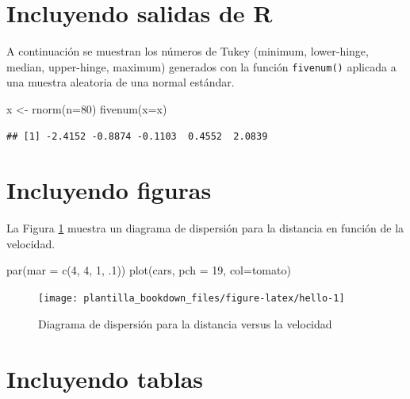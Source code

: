 \documentclass[
]{krantz}
\makeatletter
\newenvironment{Shaded}{\begin{snugshade}}{\end{snugshade}}
\newcommand{\AttributeTok}[1]{\textcolor[rgb]{0.61,0.61,0.61}{#1}}
\newcommand{\DecValTok}[1]{\textcolor[rgb]{0.06,0.06,0.06}{#1}}
\newcommand{\FunctionTok}[1]{\textcolor[rgb]{0,0,0}{#1}}
\newcommand{\NormalTok}[1]{#1}
\newcommand{\OtherTok}[1]{\textcolor[rgb]{0.37,0.37,0.37}{#1}}
\newcommand{\StringTok}[1]{\textcolor[rgb]{0.5,0.5,0.5}{#1}}
\newenvironment{kframe}{%
\medskip{}
\setlength{\fboxsep}{.8em}
 \def\at@end@of@kframe{}%
 \ifinner\ifhmode%
  \def\at@end@of@kframe{\end{minipage}}%
  \begin{minipage}{\columnwidth}%
 \fi\fi%
 \def\FrameCommand##1{\hskip\@totalleftmargin \hskip-\fboxsep
 \colorbox{shadecolor}{##1}\hskip-\fboxsep
     \hskip-\linewidth \hskip-\@totalleftmargin \hskip\columnwidth}%
 \MakeFramed {\advance\hsize-\width
   \@totalleftmargin\z@ \linewidth\hsize
   \@setminipage}}%
 {\par\unskip\endMakeFramed%
 \at@end@of@kframe}
\renewenvironment{Shaded}{\begin{kframe}}{\end{kframe}}
\makeatother
\begin{document}
\hypertarget{incluyendo-salidas-de-r}{%
\section{Incluyendo salidas de R}\label{incluyendo-salidas-de-r}}

A continuación se muestran los números de Tukey (minimum, lower-hinge, median, upper-hinge, maximum) generados con la función \texttt{fivenum()} aplicada a una muestra aleatoria de una normal estándar.

\begin{Shaded}
\begin{Highlighting}[]
\NormalTok{x }\OtherTok{\textless{}{-}} \FunctionTok{rnorm}\NormalTok{(}\AttributeTok{n=}\DecValTok{80}\NormalTok{)}
\FunctionTok{fivenum}\NormalTok{(}\AttributeTok{x=}\NormalTok{x)}
\end{Highlighting}
\end{Shaded}

\begin{verbatim}
## [1] -2.4152 -0.8874 -0.1103  0.4552  2.0839
\end{verbatim}

\hypertarget{incluyendo-figuras}{%
\section{Incluyendo figuras}\label{incluyendo-figuras}}

La Figura \ref{fig:hello} muestra un diagrama de dispersión para la distancia en función de la velocidad.

\begin{Shaded}
\begin{Highlighting}[]
\FunctionTok{par}\NormalTok{(}\AttributeTok{mar =} \FunctionTok{c}\NormalTok{(}\DecValTok{4}\NormalTok{, }\DecValTok{4}\NormalTok{, }\DecValTok{1}\NormalTok{, .}\DecValTok{1}\NormalTok{))}
\FunctionTok{plot}\NormalTok{(cars, }\AttributeTok{pch =} \DecValTok{19}\NormalTok{, }\AttributeTok{col=}\StringTok{\textquotesingle{}tomato\textquotesingle{}}\NormalTok{)}
\end{Highlighting}
\end{Shaded}

\begin{figure}
\texttt{[image: plantilla\_bookdown\_files/figure-latex/hello-1]} \caption{Diagrama de dispersión para la distancia versus la velocidad}\label{fig:hello}
\end{figure}

\hypertarget{incluyendo-tablas}{%
\section{Incluyendo tablas}\label{incluyendo-tablas}}
\end{document}
